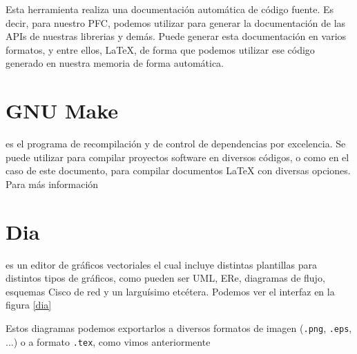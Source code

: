 Esta herramienta realiza una documentación automática de código
fuente. Es decir, para nuestro PFC, podemos utilizar para generar la
documentación de las APIs de nuestras librerias y demás. Puede generar
esta documentación en varios formatos, y entre ellos, \LaTeX, de forma
que podemos utilizar ese código generado en nuestra memoria de forma
automática.

\section*{GNU Make}

 es el programa de recompilación y de control de
dependencias por excelencia. Se puede utilizar para compilar proyectos
software en diversos códigos, o como en el caso de este documento,
para compilar documentos \LaTeX{} con diversas opciones.\\

Para más información \cite{website:voipinfo}

\section*{Dia}

 es un editor de gráficos vectoriales el cual incluye
distintas plantillas para distintos tipos de gráficos, como pueden ser
UML, ERe, diagramas de flujo, esquemas Cisco de red y un larguísimo
etcétera. Podemos ver el interfaz en la figura \ref{dia}


Estos diagramas podemos exportarlos a diversos formatos de imagen
(\texttt{.png}, \texttt{.eps}, ...) o a formato \texttt{.tex}, como
vimos anteriormente \cite{atdg11}